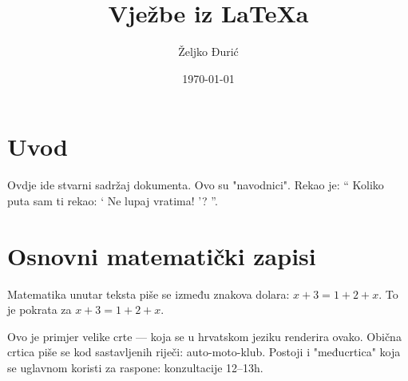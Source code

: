 \documentclass[12pt]{scrartcl}
\begin{document}
    \title{Vježbe iz \LaTeX a}
    \author{Željko Đurić}
    \date{\today}
    \maketitle
    \section{Uvod}
        Ovdje ide stvarni sadržaj dokumenta.
        Ovo su "navodnici".
        Rekao je:
        \enquote {
            Koliko puta sam ti rekao:
                \enquote {
                    Ne lupaj vratima!
                }?
        }.
    \section{Osnovni matematički zapisi}
        Matematika unutar teksta piše se između znakova dolara: $x + 3 = 1 + 2 + x$.
        To je pokrata za \(x + 3 = 1 + 2 + x\). %

        Ovo je primjer velike crte --- koja se u hrvatskom jeziku renderira ovako.
        Obična crtica piše se kod sastavljenih riječi: auto-moto-klub.
        Postoji i "međucrtica" koja se uglavnom koristi za raspone: konzultacije 12--13h.
\end{document}
